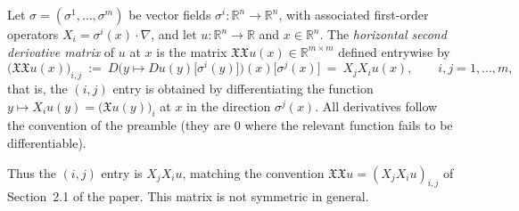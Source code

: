 \begin{definition}
Let $\sigma=(\sigma^1,\dots,\sigma^m)$ be vector fields $\sigma^i:\mathbb{R}^n\to\mathbb{R}^n$,
with associated first-order operators $X_i=\sigma^i(x)\cdot\nabla$, and let
$u:\mathbb{R}^n\to\mathbb{R}$ and $x\in\mathbb{R}^n$. The \emph{horizontal second derivative
matrix} of $u$ at $x$ is the matrix
$\mathfrak{X}\mathfrak{X}u(x)\in\mathbb{R}^{m\times m}$ defined entrywise by
$$\big(\mathfrak{X}\mathfrak{X}u(x)\big)_{i,j}\ :=\ D\Big(y\mapsto
Du(y)\big[\sigma^i(y)\big]\Big)(x)\big[\sigma^j(x)\big]\ =\ X_jX_iu(x),
\qquad i,j=1,\dots,m,$$
that is, the $(i,j)$ entry is obtained by differentiating the function
$y\mapsto X_iu(y)=\big(\mathfrak{X}u(y)\big)_i$ at $x$ in the direction $\sigma^j(x)$. All
derivatives follow the convention of the preamble (they are $0$ where the relevant function fails
to be differentiable).

Thus the $(i,j)$ entry is $X_jX_iu$, matching the convention
$\mathfrak{X}\mathfrak{X}u=(X_jX_iu)_{i,j}$ of Section~2.1 of the paper. This matrix is not
symmetric in general.
\end{definition}
